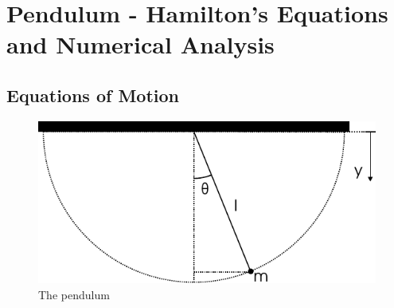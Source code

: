 \chapter{Pendulum - Hamilton's Equations and Numerical Analysis}


\section{Equations of Motion}
\begin{figure}[ht!]
\centering 
\includegraphics[scale=1.2]{fig/pendulum.pdf}
\caption{The pendulum}
\label{fig:pe}
\end{figure}
